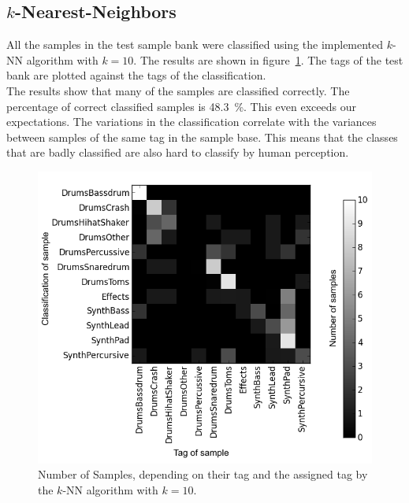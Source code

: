 \subsection{$k$-Nearest-Neighbors}
All the samples in the test sample bank were classified using the implemented $k$-NN algorithm with $k=10$. The results are shown in figure~\ref{fig:k-NN}. The tags of the test bank are plotted against the tags of the classification.\\
The results show that many of the samples are classified correctly. The percentage of correct classified samples is 48.3~\%. This even exceeds our expectations. The variations in the classification correlate with the variances between samples of the same tag in the sample base. This means that the classes that are badly classified are also hard to classify by human perception.

\begin{figure}[htbp]
\centering
\includegraphics[width=0.47\linewidth]{../plots/knn_mod.png}
\caption{Number of Samples, depending on their tag and the assigned tag by the $k$-NN algorithm with $k=10$.}
\label{fig:k-NN}
\end{figure}
